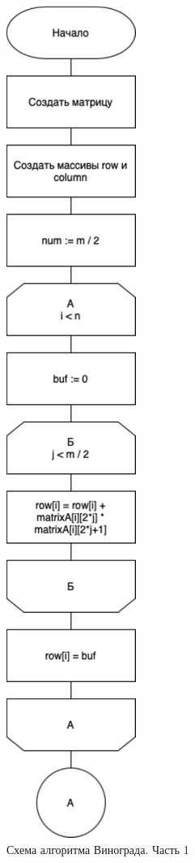 \begin{figure}[h]
    \centering
    \includegraphics[width=0.22\linewidth]{img/WinogradOptA.pdf}
    \caption{Схема алгоритма Винограда. Часть 1}
    \label{fig:WinogradOptA}
\end{figure}

